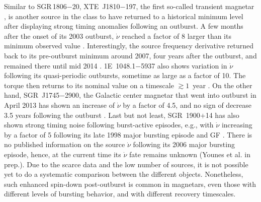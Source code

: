 \documentclass[twocolumn]{aastex6}
\def \src {SGR\,1806$-$20}
\begin{document}
Similar to \src, XTE~J1810$-$197, the first so-called transient
magnetar \citep{ibrahim04ApJ:xtej1810}, is another source in the class
to have returned to a historical minimum level after displaying strong
timing anomalies following an outburst. A few months after the onset
of its 2003 outburst, $\dot{\nu}$ reached a factor of 8 larger than
its minimum observed value \citep{halpern05ApJ:xte1810,
  bernardini09:axp1810}. Interestingly, the source frequency
derivative returned back to its pre-outburst minimum around 2007, four
years after the outburst, and remained there until mid 2014 \citep{
  pintore16MNRAS:1810,camilo16ApJ:1810}. 1E~1048.1$-$5937 also shows
variation in $\dot{\nu}$ following its quasi-periodic outbursts,
sometime as large as a factor of 10. The torque then returns to its
nominal value on a timescale $\gtrsim1$~year \citep{
  archibald15ApJ:1048}. On the other hand, SGR~J1745$-$2900, the
Galactic center magnetar that went into outburst in April 2013
\citep{kennea13ApJ:1745,mori13ApJ:1745} has shown an increase of
$\dot{\nu}$ by a factor of 4.5, and no sign of decrease 3.5 years
following the outburst \citep{kaspi14ApJ:1745,zelati17MNRAS:1745}.
Last but not least, SGR~1900$+$14 has also shown strong timing noise
following burst-active episodes, e.g., with $\dot \nu$ increasing by a
factor of 5 following its late 1998 major bursting episode and GF
\citep{woods02ApJ:1900,mereghetti06ApJ:1900}. There is no published
information on the source $\dot \nu$ following its 2006 major bursting 
episode, hence, at the current time its $\dot \nu$ fate remains
unknown (Younes et al. in prep.). Due to the scarce data and the low
number of sources, it is not possible yet to do a systematic
comparison between the different objects. Nonetheless, such enhanced
spin-down post-outburst is common in magnetars, even those with
different levels of bursting behavior, and with different recovery
timescales.
\end{document}

